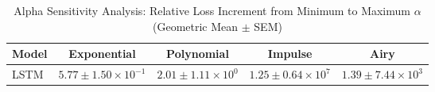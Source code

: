 
\begin{table}[h]
\centering
\caption{Alpha Sensitivity Analysis: Relative Loss Increment from Minimum to Maximum $\alpha$ (Geometric Mean $\pm$ SEM)}
\label{tab:alpha_sensitivity}
\begin{tabular}{lcccc}
\hline
Model & Exponential & Polynomial & Impulse & Airy \\
\hline
LSTM & $5.77 \pm 1.50 \times 10^{-1}$ & $2.01 \pm 1.11 \times 10^{0}$ & $1.25 \pm 0.64 \times 10^{7}$ & $1.39 \pm 7.44 \times 10^{3}$ \\
\hline
\end{tabular}
\end{table}
